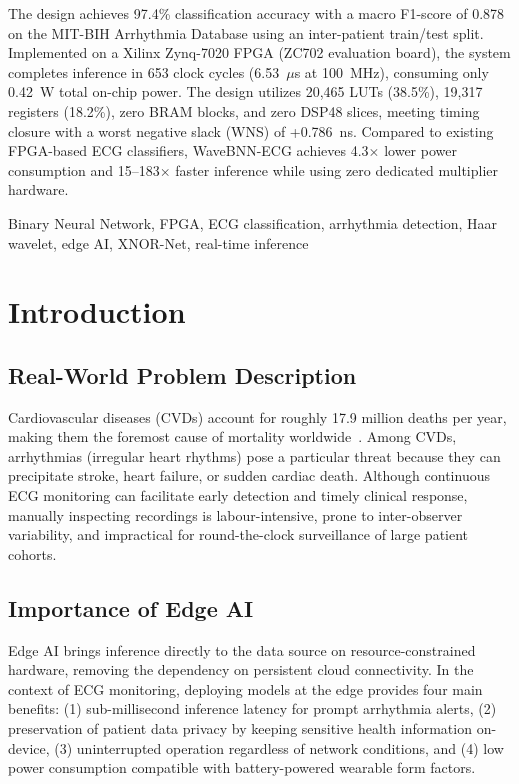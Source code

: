 \documentclass[conference]{IEEEtran}
\begin{document}
The design achieves 97.4\% classification accuracy with a macro F1-score of 0.878 on the MIT-BIH Arrhythmia Database using an inter-patient train/test split. Implemented on a Xilinx Zynq-7020 FPGA (ZC702 evaluation board), the system completes inference in 653 clock cycles (6.53~$\mu$s at 100~MHz), consuming only 0.42~W total on-chip power. The design utilizes 20,465 LUTs (38.5\%), 19,317 registers (18.2\%), zero BRAM blocks, and zero DSP48 slices, meeting timing closure with a worst negative slack (WNS) of +0.786~ns. Compared to existing FPGA-based ECG classifiers, WaveBNN-ECG achieves 4.3$\times$ lower power consumption and 15--183$\times$ faster inference while using zero dedicated multiplier hardware.

\begin{IEEEkeywords}
Binary Neural Network, FPGA, ECG classification, arrhythmia detection, Haar wavelet, edge AI, XNOR-Net, real-time inference
\end{IEEEkeywords}


\section{Introduction}

\subsection{Real-World Problem Description}

Cardiovascular diseases (CVDs) account for roughly 17.9 million deaths per year, making them the foremost cause of mortality worldwide~\cite{who2021}. Among CVDs, arrhythmias (irregular heart rhythms) pose a particular threat because they can precipitate stroke, heart failure, or sudden cardiac death. Although continuous ECG monitoring can facilitate early detection and timely clinical response, manually inspecting recordings is labour-intensive, prone to inter-observer variability, and impractical for round-the-clock surveillance of large patient cohorts.

\subsection{Importance of Edge AI}

Edge AI brings inference directly to the data source on resource-constrained hardware, removing the dependency on persistent cloud connectivity. In the context of ECG monitoring, deploying models at the edge provides four main benefits: (1) sub-millisecond inference latency for prompt arrhythmia alerts, (2) preservation of patient data privacy by keeping sensitive health information on-device, (3) uninterrupted operation regardless of network conditions, and (4) low power consumption compatible with battery-powered wearable form factors.
\end{document}
